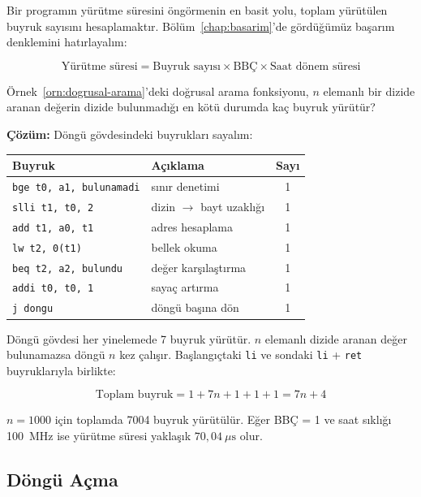 Bir programın yürütme süresini öngörmenin en basit yolu, toplam yürütülen buyruk sayısını hesaplamaktır. Bölüm~\ref{chap:basarim}'de gördüğümüz başarım denklemini hatırlayalım:

\[
\text{Yürütme süresi} = \text{Buyruk sayısı} \times \text{BBÇ} \times \text{Saat dönem süresi}
\]

\begin{ornek}[4.20]
\label{orn:buyruk-sayimi}
Örnek~\ref{orn:dogrusal-arama}'deki doğrusal arama fonksiyonu, $n$ elemanlı bir dizide aranan değerin dizide bulunmadığı en kötü durumda kaç buyruk yürütür?

\textbf{Çözüm:} Döngü gövdesindeki buyrukları sayalım:

\begin{center}
\small
\begin{tabular}{l l c}
\toprule
\textbf{Buyruk} & \textbf{Açıklama} & \textbf{Sayı} \\
\midrule
\texttt{bge t0, a1, bulunamadi} & sınır denetimi & 1 \\
\texttt{slli t1, t0, 2} & dizin $\rightarrow$ bayt uzaklığı & 1 \\
\texttt{add t1, a0, t1} & adres hesaplama & 1 \\
\texttt{lw t2, 0(t1)} & bellek okuma & 1 \\
\texttt{beq t2, a2, bulundu} & değer karşılaştırma & 1 \\
\texttt{addi t0, t0, 1} & sayaç artırma & 1 \\
\texttt{j dongu} & döngü başına dön & 1 \\
\bottomrule
\end{tabular}
\end{center}

Döngü gövdesi her yinelemede 7 buyruk yürütür. $n$ elemanlı dizide aranan değer bulunamazsa döngü $n$ kez çalışır. Başlangıçtaki \texttt{li} ve sondaki \texttt{li} + \texttt{ret} buyruklarıyla birlikte:

\[
\text{Toplam buyruk} = 1 + 7n + 1 + 1 + 1 = 7n + 4
\]

$n = 1000$ için toplamda 7004 buyruk yürütülür. Eğer BBÇ = 1 ve saat sıklığı 100~MHz ise yürütme süresi yaklaşık $70{,}04~\mu\text{s}$ olur.
\end{ornek}

\subsection{Döngü Açma}
\label{subsec:dongu-acma}

